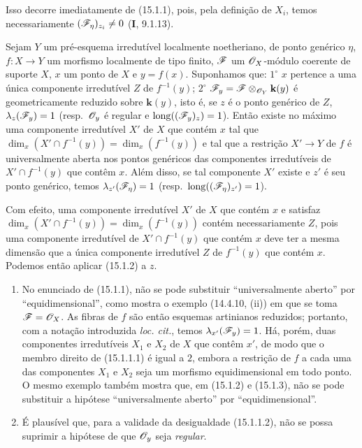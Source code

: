 Isso decorre imediatamente de (15.1.1), pois, pela definição de $X_i$, temos necessariamente $(\mathscr{F}_\eta)_{z_i}\ne0$ ($\textbf{I}$, 9.1.13).

\begin{corollary}[15.1.3]
\label{IV.15.1.3}
Sejam $Y$ um pré-esquema irredutível localmente noetheriano, de ponto genérico $\eta$, $f:X\to Y$ um morfismo localmente de tipo finito, $\mathscr{F}$ um $\mathscr{O}_X$-módulo coerente de suporte $X$, $x$ um ponto de $X$ e $y=f(x)$. Suponhamos que: $1^\circ$ $x$ pertence a uma única componente irredutível $Z$ de $f^{-1}(y)$; $2^\circ$ $\mathscr{F}_y=\mathscr{F}\otimes_{\mathscr{O}_Y}\mathbf{k}(y)$ é geometricamente reduzido sobre $\mathbf{k}(y)$, isto é, se $z$ é o ponto genérico de $Z$, $\lambda_z(\mathscr{F}_y)=1$ (resp.\ $\mathscr{O}_y$ é regular e $\operatorname{long}((\mathscr{F}_y)_z)=1$). Então existe no máximo uma componente irredutível $X'$ de $X$ que contém $x$ tal que $\dim_x(X'\cap f^{-1}(y))=\dim_x(f^{-1}(y))$ e tal que a restrição $X'\to Y$ de $f$ é universalmente aberta nos pontos genéricos das componentes irredutíveis de $X'\cap f^{-1}(y)$ que contêm $x$. Além disso, se tal componente $X'$ existe e $z'$ é seu ponto genérico, temos $\lambda_{z'}(\mathscr{F}_\eta)=1$ (resp.\ $\operatorname{long}((\mathscr{F}_\eta)_{z'})=1$).
\end{corollary}

Com efeito, uma componente irredutível $X'$ de $X$ que contém $x$ e satisfaz $\dim_x(X'\cap f^{-1}(y))=\dim_x(f^{-1}(y))$ contém necessariamente $Z$, pois uma componente irredutível de $X'\cap f^{-1}(y)$ que contém $x$ deve ter a mesma dimensão que a única componente irredutível $Z$ de $f^{-1}(y)$ que contém $x$. Podemos então aplicar (15.1.2) a $z$.

\begin{remarks}[15.1.4]
\label{IV.15.1.4}
\begin{enumerate}[label=(\roman*)]
  \item No enunciado de (15.1.1), não se pode substituir “universalmente aberto” por “equidimensional”, como mostra o exemplo (14.4.10, (ii)) em que se toma $\mathscr{F}=\mathscr{O}_X$. As fibras de $f$ são então esquemas artinianos reduzidos; portanto, com a notação introduzida \emph{loc. cit.}, temos $\lambda_{x'}(\mathscr{F}_y)=1$. Há, porém, duas componentes irredutíveis $X_1$ e $X_2$ de $X$ que contêm $x'$, de modo que o membro direito de (15.1.1.1) é igual a $2$, embora a restrição de $f$ a cada uma das componentes $X_1$ e $X_2$ seja um morfismo equidimensional em todo ponto. O mesmo exemplo também mostra que, em (15.1.2) e (15.1.3), não se pode substituir a hipótese “universalmente aberto” por “equidimensional”.
  \item É plausível que, para a validade da desigualdade (15.1.1.2), não se possa suprimir a hipótese de que $\mathscr{O}_y$ seja \emph{regular}.
\end{enumerate}
\end{remarks}

